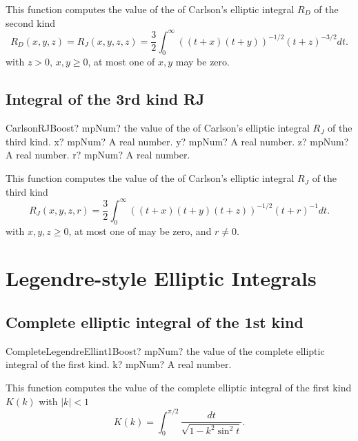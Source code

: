 \vspace{0.3cm}
This function computes the value of the of Carlson's elliptic integral $R_D$ of the second kind
\begin{equation}
	R_D(x,y,z) = R_J(x,y,z,z)  =\frac{3}{2} \int_0^\infty ((t+x)(t+y))^{-1/2} (t+z)^{-3/2}  dt.
\end{equation}
with $z>0$, $x, y \geq 0$, at most one of $x,y$ may be zero. 



\subsection{Integral of the 3rd kind RJ}

\begin{mpFunctionsExtract}
	\mpFunctionFour
	{CarlsonRJBoost? mpNum? the value of the of Carlson's elliptic integral $R_J$ of the third kind.}
	{x? mpNum? A real number.}
	{y? mpNum? A real number.}
	{z? mpNum? A real number.}
	{r? mpNum? A real number.}
\end{mpFunctionsExtract}

\vspace{0.3cm}
This function computes the value of the of Carlson's elliptic integral $R_J$ of the third kind
\begin{equation}
	R_J(x,y,z,r)  =\frac{3}{2} \int_0^\infty ((t+x)(t+y)(t+z))^{-1/2} (t+r)^{-1}  dt.
\end{equation}
with  $x, y, z \geq 0$, at most one of may be zero, and $r \neq 0$. 


\section{Legendre-style Elliptic Integrals}
\label{EllipticIntegralLegendreBoost}

\subsection{Complete elliptic integral of the 1st kind}


\begin{mpFunctionsExtract}
	
	\mpFunctionOne
	{CompleteLegendreEllint1Boost? mpNum? the value of the complete elliptic integral of the first kind.}
	{k? mpNum? A real number.}
\end{mpFunctionsExtract}

\vspace{0.3cm}
This function computes the value of the complete elliptic integral of the first kind
$K(k)$ with $|k| < 1$
\begin{equation}
	K(k)=\int_0^{\pi/2} \frac{dt}{\sqrt{1-k^2 \sin^2 t}}.
\end{equation}



